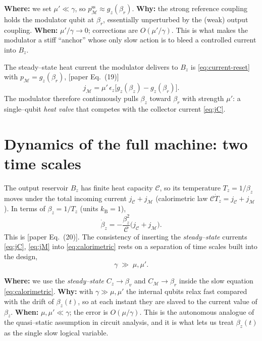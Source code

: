 \documentclass[11pt,a4paper]{article}
\newcommand{\kB}{k_{\mathrm{B}}}
\newcommand{\calC}{\mathcal{C}}
\newcommand{\calM}{\mathcal{M}}
\newcommand{\gz}{g_z}
\theoremstyle{definition}
\theoremstyle{remark}
\begin{document}
\begin{approxbox}
\textbf{Where:} we set $\mu'\ll\gamma$, so $p_\calM^{\mathrm{ss}}\approx
\gz(\beta_r)$. \textbf{Why:} the strong reference coupling holds the
modulator qubit at $\beta_r$, essentially unperturbed by the (weak)
output coupling. \textbf{When:} $\mu'/\gamma\to0$; corrections are
$O(\mu'/\gamma)$. This is what makes the modulator a stiff ``anchor''
whose only slow action is to bleed a controlled current into $B_z$.
\end{approxbox}

The steady--state heat current the modulator delivers to $B_z$ is
\eqref{eq:current-reset} with $p_\calM=\gz(\beta_r)$, [paper Eq.~(19)]
\begin{equation}
\boxed{\; j_\calM = \mu'\,\epsilon_z\big[\gz(\beta_z)-\gz(\beta_r)\big]. \;}
\label{eq:jM}
\end{equation}
The modulator therefore continuously pulls $\beta_z$ toward $\beta_r$
with strength $\mu'$: a single--qubit \emph{heat valve} that competes
with the collector current \eqref{eq:jC}.

\section{Dynamics of the full machine: two time scales}
\label{sec:dynamics}
The output reservoir $B_z$ has finite heat capacity $\calC$, so its
temperature $T_z=1/\beta_z$ moves under the total incoming current
$j_{\calC}+j_\calM$ (calorimetric law $\calC\dot T_z=j_{\calC}+j_\calM$).
In terms of $\beta_z=1/T_z$ (units $\kB=1$),
\begin{equation}
\boxed{\;
\dot\beta_z = -\frac{\beta_z^2}{\calC}\big(j_{\calC}+j_\calM\big).
\;}
\label{eq:calorimetric}
\end{equation}
This is [paper Eq.~(20)]. The consistency of inserting the
\emph{steady--state} currents \eqref{eq:jC}, \eqref{eq:jM} into
\eqref{eq:calorimetric} rests on a separation of time scales built into
the design,
\begin{equation}
\gamma \;\gg\; \mu,\mu' .
\label{eq:timescales}
\end{equation}

\begin{approxbox}
\textbf{Where:} we use the \emph{steady--state} $C_z\to\beta_v$ and
$C_\calM\to\beta_r$ inside the slow equation \eqref{eq:calorimetric}.
\textbf{Why:} with $\gamma\gg\mu,\mu'$ the internal qubits relax fast
compared with the drift of $\beta_z(t)$, so at each instant they are
slaved to the current value of $\beta_z$. \textbf{When:} $\mu,\mu'\ll
\gamma$; the error is $O(\mu/\gamma)$. This is the autonomous analogue of
the quasi--static assumption in circuit analysis, and it is what lets us
treat $\beta_z(t)$ as the single slow logical variable.
\end{approxbox}
\end{document}
